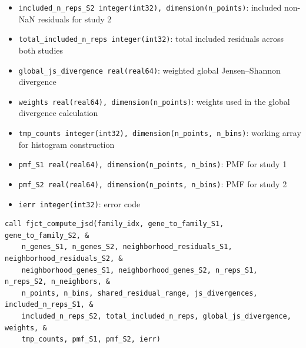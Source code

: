 \begin{enumerate}
\begin{itemize}
            \item \lstinline!included_n_reps_S2 integer(int32), dimension(n_points)!: included non-NaN residuals for study 2
            \item \lstinline!total_included_n_reps integer(int32)!: total included residuals across both studies
            \item \lstinline!global_js_divergence real(real64)!: weighted global Jensen–Shannon divergence
            \item \lstinline!weights real(real64), dimension(n_points)!: weights used in the global divergence calculation
            \item \lstinline!tmp_counts integer(int32), dimension(n_points, n_bins)!: working array for histogram construction
            \item \lstinline!pmf_S1 real(real64), dimension(n_points, n_bins)!: PMF for study 1
            \item \lstinline!pmf_S2 real(real64), dimension(n_points, n_bins)!: PMF for study 2
            \item \lstinline!ierr integer(int32)!: error code
        \end{itemize}

        \begin{lstlisting}[caption={Family-Level JSD}]
call fjct_compute_jsd(family_idx, gene_to_family_S1, gene_to_family_S2, &
    n_genes_S1, n_genes_S2, neighborhood_residuals_S1, neighborhood_residuals_S2, &
    neighborhood_genes_S1, neighborhood_genes_S2, n_reps_S1, n_reps_S2, n_neighbors, &
    n_points, n_bins, shared_residual_range, js_divergences, included_n_reps_S1, &
    included_n_reps_S2, total_included_n_reps, global_js_divergence, weights, &
    tmp_counts, pmf_S1, pmf_S2, ierr)
        \end{lstlisting}
\end{enumerate}
